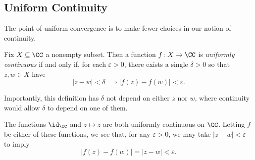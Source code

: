 \subsection{Uniform Continuity}
The point of uniform convergence is to make fewer choices in our notion of continuity.
\begin{definition}
	Fix $X\subseteq\CC$ a nonempty subset. Then a function $f\colon X\to\CC$ is \textit{uniformly continuous} if and only if, for each $\varepsilon>0$, there exists a single $\delta>0$ so that $z,w\in X$ have
	\[|z-w|<\delta\implies|f(z)-f(w)|<\varepsilon.\]
\end{definition}
Importantly, this definition has $\delta$ not depend on either $z$ nor $w$, where continuity would allow $\delta$ to depend on one of them.
\begin{example} \label{ex:conjcont}
	The functions $\id_\CC$ and $z\mapsto\overline z$ are both uniformly continuous on $\CC$. Letting $f$ be either of these functions, we see that, for any $\varepsilon>0$, we may take $|z-w|<\varepsilon$ to imply
	\[|f(z)-f(w)|=|z-w|<\varepsilon.\]
\end{example}


